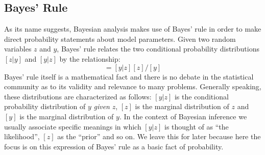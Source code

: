 \subsection{Bayes' Rule}

As its name suggests, Bayesian analysis makes use of Bayes' rule in
order to make direct probability statements about model
parameters. Given two random variables $z$ and $y$, Bayes' rule relates
the two conditional probability distributions $[z|y]$ and $[y|z]$ by
the relationship:
\begin{equation}
[z|y] = [y|z][z]/[y]
\label{glms.eq.bayes}
\end{equation}
Bayes' rule itself is a mathematical fact and there is no debate in
the statistical community as to its validity and relevance to many
problems. Generally speaking, these distributions are characterized as
follows: $[y|z]$ is the conditional probability distribution of $y$
{\it given} $z$, $[z]$ is the marginal distribution of $z$ and $[y]$
is the marginal distribution of $y$. In the context of Bayesian
inference we usually associate specific meanings in which $[y|z]$ is
thought of as ``the likelihood'', $[z]$ as the ``prior'' and so on. We
leave this for later because here the focus is on this expression of
Bayes' rule as a basic fact of probability.


